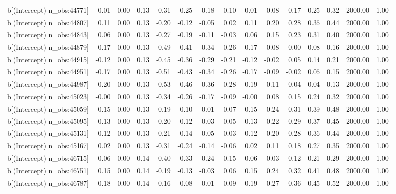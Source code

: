 \begin{table}[ht]
\begin{tabular}{rrrrrrrrrrrrrrr}
  b[(Intercept) n\_obs:44771] & -0.01 & 0.00 & 0.13 & -0.31 & -0.25 & -0.18 & -0.10 & -0.01 & 0.08 & 0.17 & 0.25 & 0.32 & 2000.00 & 1.00 \\ 
  b[(Intercept) n\_obs:44807] & 0.11 & 0.00 & 0.13 & -0.20 & -0.12 & -0.05 & 0.02 & 0.11 & 0.20 & 0.28 & 0.36 & 0.44 & 2000.00 & 1.00 \\ 
  b[(Intercept) n\_obs:44843] & 0.06 & 0.00 & 0.13 & -0.27 & -0.19 & -0.11 & -0.03 & 0.06 & 0.15 & 0.23 & 0.31 & 0.40 & 2000.00 & 1.00 \\ 
  b[(Intercept) n\_obs:44879] & -0.17 & 0.00 & 0.13 & -0.49 & -0.41 & -0.34 & -0.26 & -0.17 & -0.08 & 0.00 & 0.08 & 0.16 & 2000.00 & 1.00 \\ 
  b[(Intercept) n\_obs:44915] & -0.12 & 0.00 & 0.13 & -0.45 & -0.36 & -0.29 & -0.21 & -0.12 & -0.02 & 0.05 & 0.14 & 0.21 & 2000.00 & 1.00 \\ 
  b[(Intercept) n\_obs:44951] & -0.17 & 0.00 & 0.13 & -0.51 & -0.43 & -0.34 & -0.26 & -0.17 & -0.09 & -0.02 & 0.06 & 0.15 & 2000.00 & 1.00 \\ 
  b[(Intercept) n\_obs:44987] & -0.20 & 0.00 & 0.13 & -0.53 & -0.46 & -0.36 & -0.28 & -0.19 & -0.11 & -0.04 & 0.04 & 0.13 & 2000.00 & 1.00 \\ 
  b[(Intercept) n\_obs:45023] & -0.00 & 0.00 & 0.13 & -0.34 & -0.26 & -0.17 & -0.09 & -0.00 & 0.08 & 0.15 & 0.24 & 0.32 & 2000.00 & 1.00 \\ 
  b[(Intercept) n\_obs:45059] & 0.15 & 0.00 & 0.13 & -0.19 & -0.10 & -0.01 & 0.07 & 0.15 & 0.24 & 0.31 & 0.39 & 0.48 & 2000.00 & 1.00 \\ 
  b[(Intercept) n\_obs:45095] & 0.13 & 0.00 & 0.13 & -0.20 & -0.12 & -0.03 & 0.05 & 0.13 & 0.22 & 0.29 & 0.37 & 0.45 & 2000.00 & 1.00 \\ 
  b[(Intercept) n\_obs:45131] & 0.12 & 0.00 & 0.13 & -0.21 & -0.14 & -0.05 & 0.03 & 0.12 & 0.20 & 0.28 & 0.36 & 0.44 & 2000.00 & 1.00 \\ 
  b[(Intercept) n\_obs:45167] & 0.02 & 0.00 & 0.13 & -0.31 & -0.24 & -0.14 & -0.06 & 0.02 & 0.11 & 0.18 & 0.27 & 0.35 & 2000.00 & 1.00 \\ 
  b[(Intercept) n\_obs:46715] & -0.06 & 0.00 & 0.14 & -0.40 & -0.33 & -0.24 & -0.15 & -0.06 & 0.03 & 0.12 & 0.21 & 0.29 & 2000.00 & 1.00 \\ 
  b[(Intercept) n\_obs:46751] & 0.15 & 0.00 & 0.14 & -0.19 & -0.13 & -0.03 & 0.06 & 0.15 & 0.24 & 0.32 & 0.41 & 0.48 & 2000.00 & 1.00 \\ 
  b[(Intercept) n\_obs:46787] & 0.18 & 0.00 & 0.14 & -0.16 & -0.08 & 0.01 & 0.09 & 0.19 & 0.27 & 0.36 & 0.45 & 0.52 & 2000.00 & 1.00 \\ 

\end{tabular}
\end{table}
